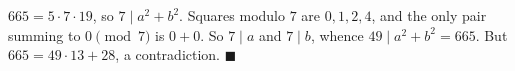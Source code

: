 $665=5\cdot7\cdot19$, so $7\mid a^2+b^2$. Squares modulo $7$ are $0,1,2,4$, and the only pair summing to $0\pmod7$ is $0+0$. So $7\mid a$ and $7\mid b$, whence $49\mid a^2+b^2=665$. But $665=49\cdot13+28$, a contradiction. $\blacksquare$
